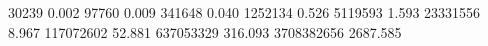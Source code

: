 30239      0.002
97760      0.009
341648     0.040
1252134    0.526
5119593    1.593
23331556   8.967
117072602  52.881
637053329  316.093
3708382656 2687.585
